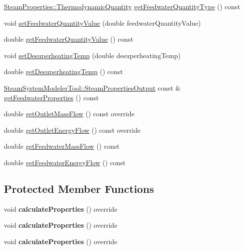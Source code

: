 \begin{DoxyCompactItemize}
\item 
\hyperlink{class_steam_properties_ae0294bedf7d178c2d8fb6aed0f62fbff}{Steam\+Properties\+::\+Thermodynamic\+Quantity} \hyperlink{class_prv_with_desuperheating_aa6901e00ecf819d95f79c20ef1775876}{get\+Feedwater\+Quantity\+Type} () const
\item 
void \hyperlink{class_prv_with_desuperheating_afc17940f7d61898eda1bb4a6f1fea8c3}{set\+Feedwater\+Quantity\+Value} (double feedwater\+Quantity\+Value)
\item 
double \hyperlink{class_prv_with_desuperheating_a8645a251b2e77e434a8bc51dfedcad69}{get\+Feedwater\+Quantity\+Value} () const
\item 
void \hyperlink{class_prv_with_desuperheating_ade1b153c495efb451006b3c054ff386e}{set\+Desuperheating\+Temp} (double desuperheating\+Temp)
\item 
double \hyperlink{class_prv_with_desuperheating_af334a9ff9a14d110cb2851a76d5d84fb}{get\+Desuperheating\+Temp} () const
\item 
\hyperlink{struct_steam_system_modeler_tool_1_1_steam_properties_output}{Steam\+System\+Modeler\+Tool\+::\+Steam\+Properties\+Output} const  \& \hyperlink{class_prv_with_desuperheating_a8f4594109bda9bc4030c23cee9841fa8}{get\+Feedwater\+Properties} () const
\item 
double \hyperlink{class_prv_with_desuperheating_a76c03ff2f54c85cd0c80543f23549635}{get\+Outlet\+Mass\+Flow} () const override
\item 
double \hyperlink{class_prv_with_desuperheating_a2394fb62e4fc85252fc4eb15f08e9f1e}{get\+Outlet\+Energy\+Flow} () const override
\item 
double \hyperlink{class_prv_with_desuperheating_a9bd8ee7d5b563110a7279102352b8f4d}{get\+Feedwater\+Mass\+Flow} () const
\item 
double \hyperlink{class_prv_with_desuperheating_a42945a77fcdbaf1e1844c444c696f8b0}{get\+Feedwater\+Energy\+Flow} () const
\end{DoxyCompactItemize}
\subsection*{Protected Member Functions}
\begin{DoxyCompactItemize}
\item 
\mbox{\label{class_prv_with_desuperheating_af400ed7c148f708ca087bd79228586f3}} 
void {\bfseries calculate\+Properties} () override
\item 
\mbox{\label{class_prv_with_desuperheating_af400ed7c148f708ca087bd79228586f3}} 
void {\bfseries calculate\+Properties} () override
\item 
\mbox{\label{class_prv_with_desuperheating_af400ed7c148f708ca087bd79228586f3}} 
void {\bfseries calculate\+Properties} () override
\end{DoxyCompactItemize}

